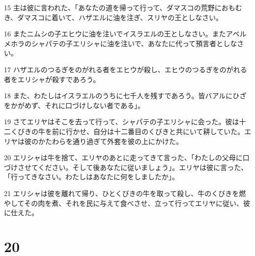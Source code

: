 \par 15 主は彼に言われた、「あなたの道を帰って行って、ダマスコの荒野におもむき、ダマスコに着いて、ハザエルに油を注ぎ、スリヤの王としなさい。
\par 16 またニムシの子エヒウに油を注いでイスラエルの王としなさい。またアベルメホラのシャパテの子エリシャに油を注いで、あなたに代って預言者としなさい。
\par 17 ハザエルのつるぎをのがれる者をエヒウが殺し、エヒウのつるぎをのがれる者をエリシャが殺すであろう。
\par 18 また、わたしはイスラエルのうちに七千人を残すであろう。皆バアルにひざをかがめず、それに口づけしない者である」。
\par 19 さてエリヤはそこを去って行って、シャパテの子エリシャに会った。彼は十二くびきの牛を前に行かせ、自分は十二番目のくびきと共にいて耕していた。エリヤは彼のかたわらを通り過ぎて外套を彼の上にかけた。
\par 20 エリシャは牛を捨て、エリヤのあとに走ってきて言った、「わたしの父母に口づけさせてください。そして後あなたに従いましょう」。エリヤは彼に言った、「行ってきなさい。わたしはあなたに何をしましたか」。
\par 21 エリシャは彼を離れて帰り、ひとくびきの牛を取って殺し、牛のくびきを燃やしてその肉を煮、それを民に与えて食べさせ、立って行ってエリヤに従い、彼に仕えた。

\chapter{20}

